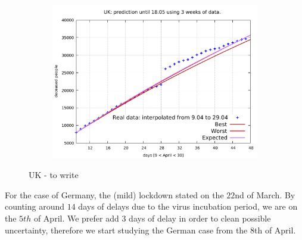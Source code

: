 \documentclass[8pt]{article}
\begin{document}
\begin{figure}[h!]
\begin{subfigure}[b]{0.45\linewidth}
  \includegraphics[width=\linewidth]{../simulations/uk/9-29/9-29.pdf}
  \end{subfigure}
	\caption{UK - to write}
\end{figure}
For the case of Germany, the (mild) lockdown stated on the $22$nd of March.
By counting around $14$ days of delays due to the virus incubation period,
we are on the $5th$ of April. We prefer add $3$ days of delay in order
to clean possible uncertainty, therefore we start studying the German
case from the $8$th of April.
\end{document}
